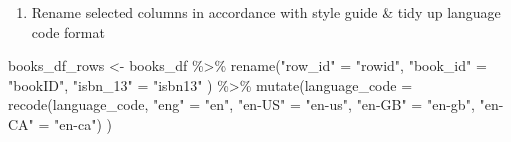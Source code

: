 \documentclass[
]{article}
\newenvironment{Shaded}{\begin{snugshade}}{\end{snugshade}}
\newcommand{\AttributeTok}[1]{\textcolor[rgb]{0.77,0.63,0.00}{#1}}
\newcommand{\FunctionTok}[1]{\textcolor[rgb]{0.00,0.00,0.00}{#1}}
\newcommand{\NormalTok}[1]{#1}
\newcommand{\OtherTok}[1]{\textcolor[rgb]{0.56,0.35,0.01}{#1}}
\newcommand{\SpecialCharTok}[1]{\textcolor[rgb]{0.00,0.00,0.00}{#1}}
\newcommand{\StringTok}[1]{\textcolor[rgb]{0.31,0.60,0.02}{#1}}
\providecommand{\tightlist}{%
  \setlength{\itemsep}{0pt}\setlength{\parskip}{0pt}}
\begin{document}
\begin{enumerate}
\def\labelenumi{\arabic{enumi}.}
\setcounter{enumi}{3}
\tightlist
\item
  Rename selected columns in accordance with style guide \& tidy up
  language code format
\end{enumerate}

\begin{Shaded}
\begin{Highlighting}[]
\NormalTok{books\_df\_rows }\OtherTok{\textless{}{-}}\NormalTok{ books\_df }\SpecialCharTok{\%\textgreater{}\%} 
  \FunctionTok{rename}\NormalTok{(}\StringTok{"row\_id"} \OtherTok{=} \StringTok{"rowid"}\NormalTok{,}
         \StringTok{"book\_id"} \OtherTok{=} \StringTok{"bookID"}\NormalTok{,}
         \StringTok{"isbn\_13"} \OtherTok{=} \StringTok{"isbn13"}
\NormalTok{         ) }\SpecialCharTok{\%\textgreater{}\%} 
  \FunctionTok{mutate}\NormalTok{(}\AttributeTok{language\_code =} \FunctionTok{recode}\NormalTok{(language\_code,}
                                \StringTok{"eng"} \OtherTok{=} \StringTok{"en"}\NormalTok{,}
                                \StringTok{"en{-}US"} \OtherTok{=} \StringTok{"en{-}us"}\NormalTok{,}
                                \StringTok{"en{-}GB"} \OtherTok{=} \StringTok{"en{-}gb"}\NormalTok{,}
                                \StringTok{"en{-}CA"} \OtherTok{=} \StringTok{"en{-}ca"}\NormalTok{)}
\NormalTok{)}
\end{Highlighting}
\end{Shaded}
\end{document}
